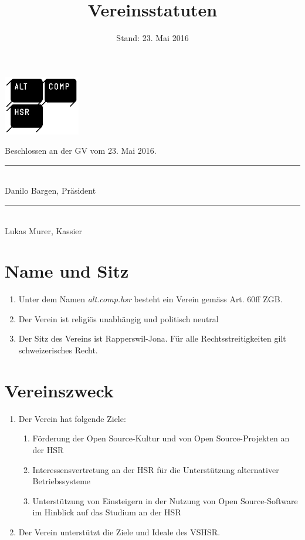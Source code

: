 \documentclass[10pt,a4paper,parskip,fleqn]{scrartcl}
\title{\Huge Vereinsstatuten}
\date{Stand: 23. Mai 2016}
\newcommand{\ol}{\begin{enumerate}[itemsep=-0.2em,topsep=-0.2em]}
\newcommand{\lo}{\end{enumerate}}
\newcommand{\li}{\item}
\begin{document}
\begin{titlepage}
  \maketitle
  \thispagestyle{empty} %
  \begin{center}
    \includegraphics[width=0.25\textwidth]{logo.png}\\

    \vfill

    \large Beschlossen an der GV vom 23. Mai 2016.

    \vspace{1.5cm}

    \begin{minipage}[t]{0.49\textwidth}
      \center
      \rule{5cm}{0.2mm}\\
      Danilo Bargen, Präsident
      \endcenter
    \end{minipage}
    \begin{minipage}[t]{0.49\textwidth}
      \center
      \rule{5cm}{0.2mm}\\
      Lukas Murer, Kassier
      \endcenter
    \end{minipage}
  \end{center}
\end{titlepage}


\section{Name und Sitz}

\ol
  \li Unter dem Namen \textit{alt.comp.hsr} besteht ein Verein gemäss Art. 60ff
  ZGB.
  \li Der Verein ist religiös unabhängig und politisch neutral
  \li Der Sitz des Vereins ist Rapperswil-Jona. Für alle Rechtsstreitigkeiten
  gilt schweizerisches Recht.
\lo


\section{Vereinszweck}

\ol
  \li Der Verein hat folgende Ziele:
    \ol
      \li Förderung der Open Source-Kultur und von Open Source-Projekten an
      der HSR
      \li Interessensvertretung an der HSR für die Unterstützung
      alternativer Betriebssysteme
      \li Unterstützung von Einsteigern in der Nutzung von Open
      Source-Software im Hinblick auf das Studium an der HSR
    \lo
  \li Der Verein unterstützt die Ziele und Ideale des VSHSR. 
\lo
\end{document}
